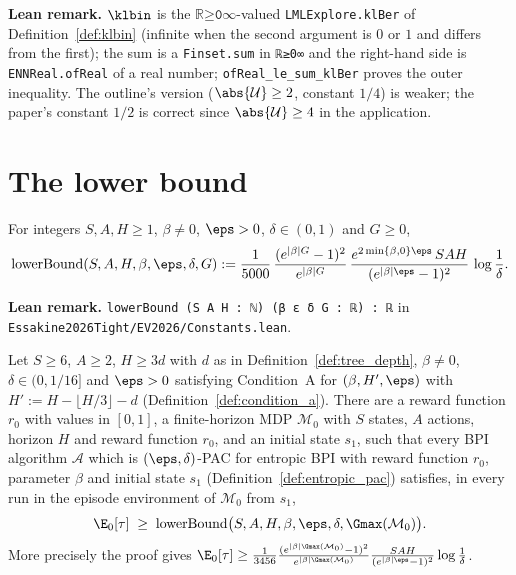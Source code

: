 \textbf{Lean remark.} $\klbin$ is the $\texttt{ℝ≥0∞}$-valued \texttt{LMLExplore.klBer} of
Definition~\ref{def:klbin} (infinite when the second argument is $0$ or $1$ and differs from the
first); the sum is a \texttt{Finset.sum} in \texttt{ℝ≥0∞} and the
right-hand side is \texttt{ENNReal.ofReal} of a real number; \texttt{ofReal\_le\_sum\_klBer} proves
the outer inequality. The outline's version
($\abs{\mathcal U} \ge 2$, constant $1/4$) is weaker; the paper's constant $1/2$ is correct
since $\abs{\mathcal U} \ge 4$ in the application.

\section{The lower bound}
\label{sec:lb_theorem}

\begin{definition}\label{def:lower_bound_const}
\leanok
{}
For integers $S, A, H \ge 1$, $\beta \ne 0$, $\eps > 0$, $\delta \in (0,1)$ and $G \ge 0$,
\[
  \mathrm{lowerBound}(S, A, H, \beta, \eps, \delta, G) := \frac{1}{5000}\,\frac{(e^{|\beta| G} - 1)^2}{e^{|\beta| G}}\,
  \frac{e^{2\min\{\beta, 0\}\eps}\, S A H}{(e^{|\beta|\eps} - 1)^2}\,\log\frac1\delta .
\]
\end{definition}

\textbf{Lean remark.} \texttt{lowerBound (S A H : ℕ) (β ε δ G : ℝ) : ℝ} in
\texttt{Essakine2026Tight/EV2026/Constants.lean}.

\begin{theorem}\label{thm:lower_bound}
\leanok
{}
Let $S \ge 6$, $A \ge 2$, $H \ge 3d$ with $d$ as in Definition~\ref{def:tree_depth}, $\beta \ne 0$,
$\delta \in (0, 1/16]$ and $\eps > 0$ satisfying Condition~A for $(\beta, H', \eps)$ with
$H' := H - \lfloor H/3 \rfloor - d$ (Definition~\ref{def:condition_a}). There are a reward
function $r_0$ with values in $[0,1]$, a finite-horizon MDP $\mathcal M_0$ with $S$ states, $A$
actions, horizon $H$ and reward function $r_0$, and an initial state $s_1$, such that every BPI
algorithm $\mathcal A$ which is $(\eps,\delta)$-PAC for entropic BPI with reward function $r_0$,
parameter $\beta$ and initial state $s_1$ (Definition~\ref{def:entropic_pac}) satisfies, in every
run in the episode environment of $\mathcal M_0$ from $s_1$,
\[
  \E_0[\tau] \;\ge\; \mathrm{lowerBound}\big(S, A, H, \beta, \eps, \delta, \Gmax(\mathcal M_0)\big) .
\]
More precisely the proof gives $\E_0[\tau] \ge \frac{1}{3456}\frac{(e^{|\beta|\Gmax(\mathcal M_0)} - 1)^2}{e^{|\beta|\Gmax(\mathcal M_0)}}\frac{SAH}{(e^{|\beta|\eps}-1)^2}\log\frac1\delta$.
\end{theorem}

